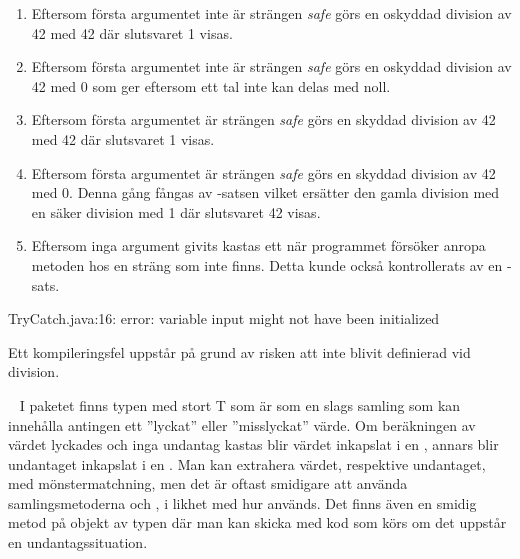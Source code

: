 \SubtaskSolved  \begin{enumerate}
\item Eftersom första argumentet inte är strängen \textit{safe} görs en oskyddad division av 42 med 42 där slutsvaret 1 visas.
\item Eftersom första argumentet inte är strängen \textit{safe} görs en oskyddad division av 42 med 0 som ger  eftersom ett tal inte kan delas med noll.
\item Eftersom första argumentet är strängen \textit{safe} görs en skyddad division av 42 med 42 där slutsvaret 1 visas.
\item Eftersom första argumentet är strängen \textit{safe} görs en skyddad division av 42 med 0. Denna gång fångas  av -satsen vilket ersätter den gamla division med en säker division med 1 där slutsvaret 42 visas.
\item Eftersom inga argument givits kastas ett  när programmet försöker anropa  metoden hos en sträng som inte finns. Detta kunde också kontrollerats av en -sats.
\end{enumerate}

\SubtaskSolved  \begin{REPL}
TryCatch.java:16: error: variable input might not have been initialized
\end{REPL}
Ett kompileringsfel uppstår på grund av risken att  inte blivit definierad vid division.




\QUESTEND







\QUESTBEGIN

\Task  \what~  I paketet  finns typen  med stort T som är som en slags samling som kan innehålla antingen ett ''lyckat'' eller ''misslyckat'' värde. Om beräkningen av värdet lyckades och inga undantag kastas blir värdet inkapslat i en , annars blir undantaget inkapslat i en . Man kan extrahera värdet, respektive undantaget, med mönstermatchning, men det är oftast smidigare att använda samlingsmetoderna  och , i likhet med hur  används. Det finns även en smidig metod  på objekt av typen  där man kan skicka med kod som körs om det uppstår en undantagssituation.

